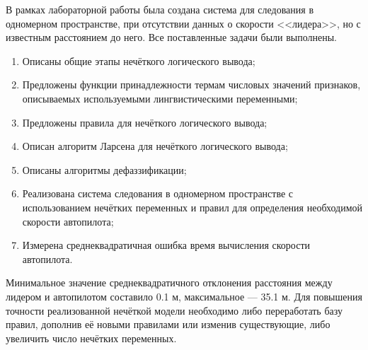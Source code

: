 
В рамках лабораторной работы была создана система для следования в одномерном пространстве, при отсутствии данных о скорости <<лидера>>, но с известным расстоянием до него. Все поставленные задачи были выполнены.

\begin{enumerate}[label*=\arabic*)]
	\item Описаны общие этапы нечёткого логического вывода;
	\item Предложены функции принадлежности термам числовых значений признаков, описываемых используемыми лингвистическими переменными;
	\item Предложены правила для нечёткого логического вывода;
	\item Описан алгоритм Ларсена для нечёткого логического вывода;
	\item Описаны алгоритмы дефаззификации;
	\item Реализована система следования в одномерном пространстве с использованием нечётких переменных и правил для определения необходимой скорости автопилота;
	\item Измерена среднеквадратичная ошибка время вычисления скорости автопилота.
\end{enumerate}

Минимальное значение среднеквадратичного отклонения расстояния между лидером и автопилотом составило 0.1 м, максимальное --- 35.1 м. Для повышения точности реализованной нечёткой модели необходимо либо переработать базу правил, дополнив её новыми правилами или изменив существующие, либо увеличить число нечётких переменных.
